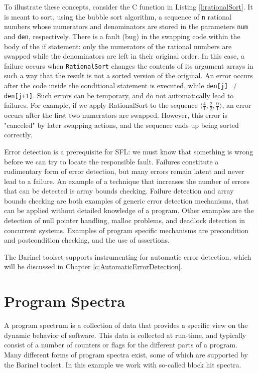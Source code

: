 To illustrate these concepts, consider the C 
function in Listing \ref{l:rationalSort}. 
It is meant to sort, using the 
bubble sort algorithm, a sequence of \verb|n| rational numbers
whose numerators and denominators are stored in the
parameters \verb|num| and \verb|den|, respectively. There is a fault
(bug) in the swapping code within the body of the if
statement: only the numerators of the rational 
numbers are swapped while the denominators are left in
their original order. In this case, a failure occurs
when \verb|RationalSort| changes the contents of its 
argument arrays in such a way that the result is not a
sorted version of the original. An error occurs after
the code inside the conditional statement is executed,
while \verb|den[j]| $\neq$ \verb|den[j+1]|. Such errors can be 
temporary, and do not automatically lead to failures. For
example, if we apply RationalSort to the sequence
$\langle \frac{4}{1}, \frac{2}{2}, \frac{0}{1} \rangle$,
an error occurs after the first two 
numerators are swapped. However, this error is "canceled" by
later swapping actions, and the sequence ends up being
sorted correctly.

Error detection is a prerequisite for SFL: we must know
that something is wrong before we can try to locate
the responsible fault. Failures constitute a 
rudimentary form of error detection, but many errors remain
latent and never lead to a failure. An example of a
technique that increases the number of errors that can
be detected is array bounds checking. Failure 
detection and array bounds checking are both examples of
generic error detection mechanisms, that can be 
applied without detailed knowledge of a program. Other
examples are the detection of null pointer handling,
malloc problems, and deadlock detection in concurrent
systems. Examples of program specific mechanisms are
precondition and postcondition checking, and the use
of assertions.

The Barinel toolset supports instrumenting for 
automatic error detection, which will be discussed in
Chapter \ref{c:AutomaticErrorDetection}.

\section{Program Spectra}
A program spectrum is a collection of data that
provides a specific view on the dynamic behavior of
software. This data is collected at run-time, and 
typically consist of a number of counters or 
flags for the
different parts of a program. Many different forms of
program spectra exist, some of which are supported by the Barinel toolset. 
In this example
we work with so-called block hit spectra.

